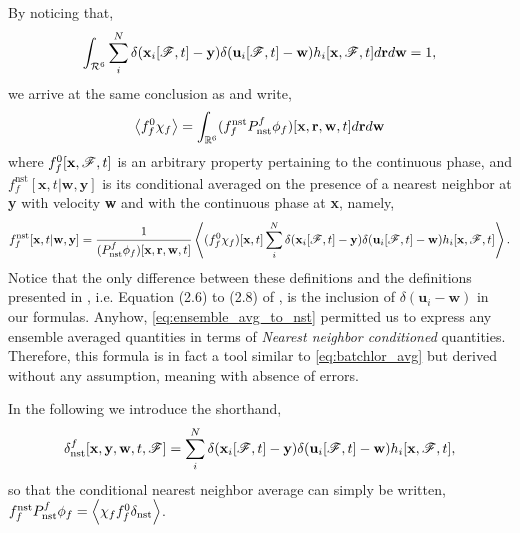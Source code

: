 By noticing that, 
\begin{equation}
    \int_{\mathcal{R}^6}
    \sum_i^N 
    \delta(\textbf{x}_i[\mathscr{F},t]-\textbf{y})
    \delta(\textbf{u}_i[\mathscr{F},t]-\textbf{w})
    h_i[\textbf{x},\mathscr{F},t]
    d\textbf{r}
    d\textbf{w} 
    =1,
\end{equation}
we arrive at the same conclusion as \citet{zhang2021ensemble} and write, 
\begin{equation}
    \avg{f_f^0\chi_f}
    = 
    \int_{\mathbb{R}^6}
    (f_f^\text{nst}P_\text{nst}^f\phi_f)[\textbf{x},\textbf{r},\textbf{w},t]
    d\textbf{r}
    d\textbf{w}
    \label{eq:ensemble_avg_to_nst}
\end{equation} 
where $f_f^0[\textbf{x},\mathscr{F},t]$ is an arbitrary property pertaining to the continuous phase, and $f_f^\text{nst}[\textbf{x},t|\textbf{w},\textbf{y}]$ is its conditional averaged on the presence of a nearest neighbor at \textbf{y} with velocity \textbf{w} and with the continuous phase at \textbf{x}, namely, 
\begin{equation}
    f_f^\text{nst}[\textbf{x},t|\textbf{w},\textbf{y}]
    =\frac{1}{(P_\text{nst}^f\phi_f) [\textbf{x},\textbf{r},\textbf{w},t]}
    \avg{
        (f_f^0
        \chi_f)[\textbf{x},t]
        \sum_i^N 
        \delta(\textbf{x}_i[\FF,t]-\textbf{y})
        \delta(\textbf{u}_i[\FF,t]-\textbf{w})
        h_i[\textbf{x},\FF,t]
    }.
    \label{eq:def_f_nst}
\end{equation}
Notice that the only difference between these definitions and the definitions presented in \citet{zhang2021ensemble}, i.e. Equation (2.6) to (2.8) of \citet{zhang2021ensemble}, is the inclusion of $\delta(\textbf{u}_i - \textbf{w})$ in our formulas. 
Anyhow, \ref{eq:ensemble_avg_to_nst} permitted us to express any ensemble averaged quantities in terms of \textit{Nearest neighbor conditioned} quantities. 
Therefore, this formula is in fact a tool similar to \ref{eq:batchlor_avg} but derived without any assumption, meaning with absence of errors. 

In the following we introduce the shorthand, 
\begin{equation*}
    \delta_\text{nst}^f [\textbf{x},\textbf{y},\textbf{w},t,\mathscr{F}]
    =
    \sum_i^N 
    \delta(\textbf{x}_i[\mathscr{F},t]-\textbf{y})
    \delta(\textbf{u}_i[\mathscr{F},t]-\textbf{w})
    h_i[\textbf{x},\mathscr{F},t],
\end{equation*}
so that the conditional nearest neighbor average can simply be written, $f_f^\text{nst} P_\text{nst}^f \phi_f = \left<\chi_f f_f^0 \delta_\text{nst}\right>$.


